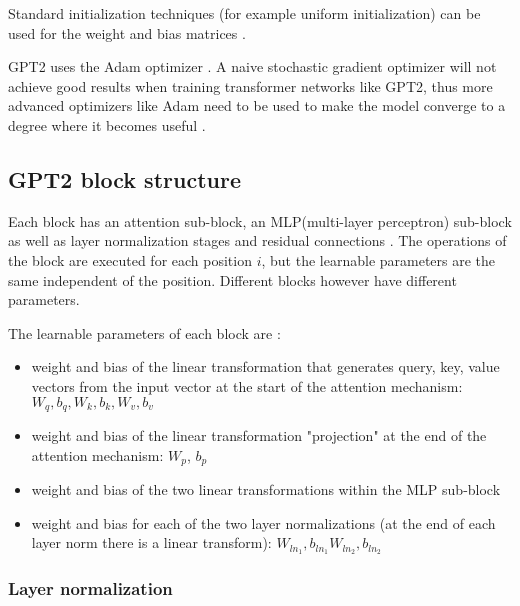 Standard initialization techniques (for example uniform initialization) can be used for the weight and bias matrices .

GPT2 uses the Adam optimizer .
A naive stochastic gradient optimizer will not achieve good results when training transformer networks like GPT2, thus more advanced optimizers like Adam need to be used to make the model converge to a degree where it becomes useful \cite{adambeatssgd}.


\subsection{GPT2 block structure}

\label{gpt2:block}


Each block has an attention sub-block, an MLP(multi-layer perceptron) sub-block as well as layer normalization stages and residual connections  .
The operations of the block are executed for each position $i$, but the learnable parameters are the same independent of the position. Different blocks however have different parameters.

The learnable parameters of each block are \cite{alammar-gpt2}:

\begin{itemize}
\item weight and bias of the linear transformation that generates query, key, value vectors from the input vector
   at the start of the attention mechanism: $W_q, b_q, W_k, b_k, W_v, b_v$
 \item weight and bias of the linear transformation "projection" at the end of the attention mechanism: $W_p$, $b_p$
 \item weight and bias of the two linear transformations within the MLP sub-block
 \item weight and bias for each of the two layer normalizations (at the end of each layer norm there is a linear transform): $W_{ln_1}, b_{ln_1} W_{ln_2}, b_{ln_2}$
\end{itemize}

\subsubsection{Layer normalization}

